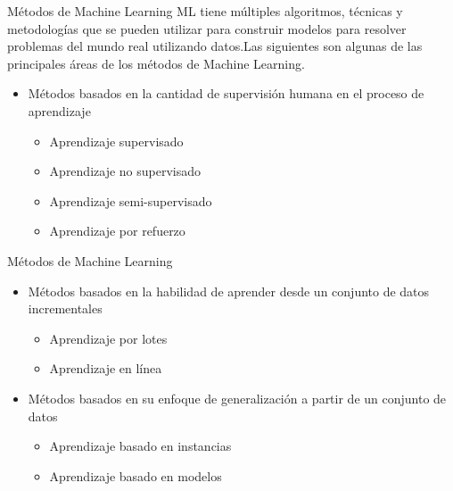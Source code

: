 \documentclass[11pt,aspectratio=169]{beamer}
\begin{document}
\begin{frame}{Métodos de Machine Learning}
ML tiene múltiples algoritmos, técnicas y metodologías que se pueden utilizar para construir modelos para resolver problemas del mundo
real utilizando datos.\pause Las siguientes son algunas de las principales áreas de los métodos de Machine Learning.\pause

\begin{itemize}
	\item Métodos basados en la cantidad de supervisión humana en el proceso de aprendizaje\pause
		\begin{itemize}
			\item Aprendizaje supervisado\pause
			\item Aprendizaje no supervisado\pause
			\item Aprendizaje semi-supervisado\pause
			\item Aprendizaje por refuerzo
		\end{itemize}
\end{itemize}
\end{frame}

\begin{frame}{Métodos de Machine Learning}
\begin{itemize}

	\item Métodos basados en la habilidad de aprender desde un conjunto de datos incrementales\pause
		\begin{itemize}
			\item Aprendizaje por lotes\pause
			\item Aprendizaje en línea\pause
		\end{itemize}
	\item Métodos basados en su enfoque de generalización a partir de un conjunto de datos\pause
		\begin{itemize}
			\item Aprendizaje basado en instancias\pause
			\item Aprendizaje basado en modelos
		\end{itemize}
\end{itemize}
\end{frame}
\end{document}

